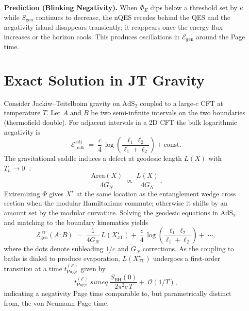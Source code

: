 \documentclass[11pt]{article}
\newcommand{\Area}{\mathrm{Area}}
\newcommand{\E}{\mathcal{E}}
\begin{document}
\noindent\textbf{Prediction (Blinking Negativity).} When $\overline{\Phi}_E$ dips below a threshold set by $\kappa$ while $S_{\mathrm{gen}}$ continues to decrease, the nQES recedes behind the QES and the negativity island disappears transiently; it reappears once the energy flux increases or the horizon cools. This produces oscillations in $\E_{\mathrm{gen}}$ around the Page time.

\section{Exact Solution in JT Gravity}
Consider Jackiw--Teitelboim gravity on $\mathrm{AdS}_2$ coupled to a large-$c$ CFT at temperature $T$.
Let $A$ and $B$ be two semi-infinite intervals on the two boundaries (thermofield double). For adjacent intervals in a 2D CFT the bulk logarithmic negativity is
\begin{equation}
  \E_{\mathrm{bulk}}^{\mathrm{adj}} \;=\; \frac{c}{4}\,\log\!\left(\frac{\ell_1\,\ell_2}{\ell_1+\ell_2}\right) + \text{const.}
\end{equation}
The gravitational saddle induces a defect at geodesic length $L(X)$ with $T_{n}\rightarrow 0^+$:
\begin{equation}
  \frac{\Area(X)}{4G_N} \;\propto\; \frac{L(X)}{4G_N}\,.
\end{equation}
Extremizing $\Phi$ gives $X^\star$ at the same location as the entanglement wedge cross section when the modular Hamiltonians commute; otherwise it shifts by an amount set by the modular curvature.
Solving the geodesic equations in $\mathrm{AdS}_2$ and matching to the boundary kinematics yields
\begin{equation}
  \E_{\mathrm{gen}}^{\mathrm{JT}}(A:B) \;=\; \frac{1}{4G_N}\, L(X^\star_{\mathrm{JT}}) +\; \frac{c}{4}\,\log\!\left(\frac{\ell_1\,\ell_2}{\ell_1+\ell_2}\right) +\; \cdots,
\end{equation}
where the dots denote subleading $1/c$ and $G_N$ corrections.
As the coupling to baths is dialed to produce evaporation, $L(X^\star_{\mathrm{JT}})$ undergoes a first-order transition at a time $t_{\mathrm{Page}}^{(\E)}$ given by
\begin{equation}
  t_{\mathrm{Page}}^{(\E)} \;simeq\; \frac{S_{\mathrm{BH}}(0)}{2\pi^2 c\,T} +\; \mathcal{O}(1/T),
\end{equation}
indicating a negativity Page time comparable to, but parametrically distinct from, the von Neumann Page time.
\end{document}
